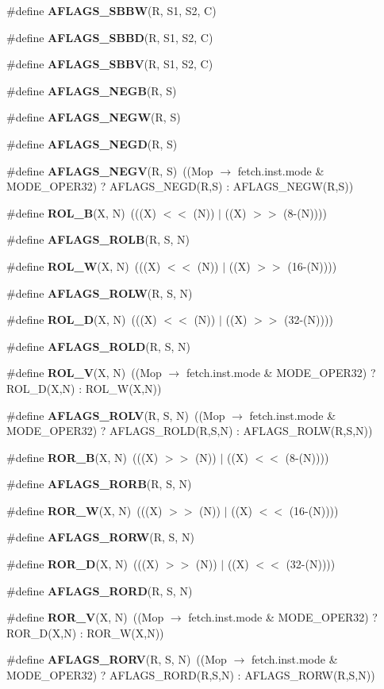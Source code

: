 \begin{CompactItemize}
\#define {\bf AFLAGS\_\-SBBW}(R, S1, S2, C)
\item 
\#define {\bf AFLAGS\_\-SBBD}(R, S1, S2, C)
\item 
\#define {\bf AFLAGS\_\-SBBV}(R, S1, S2, C)
\item 
\#define {\bf AFLAGS\_\-NEGB}(R, S)
\item 
\#define {\bf AFLAGS\_\-NEGW}(R, S)
\item 
\#define {\bf AFLAGS\_\-NEGD}(R, S)
\item 
\#define {\bf AFLAGS\_\-NEGV}(R, S)~((Mop $\rightarrow$ fetch.inst.mode \& MODE\_\-OPER32) ? AFLAGS\_\-NEGD(R,S) : AFLAGS\_\-NEGW(R,S))
\item 
\#define {\bf ROL\_\-B}(X, N)~(((X) $<$$<$ (N)) $|$ ((X) $>$$>$ (8-(N))))
\item 
\#define {\bf AFLAGS\_\-ROLB}(R, S, N)
\item 
\#define {\bf ROL\_\-W}(X, N)~(((X) $<$$<$ (N)) $|$ ((X) $>$$>$ (16-(N))))
\item 
\#define {\bf AFLAGS\_\-ROLW}(R, S, N)
\item 
\#define {\bf ROL\_\-D}(X, N)~(((X) $<$$<$ (N)) $|$ ((X) $>$$>$ (32-(N))))
\item 
\#define {\bf AFLAGS\_\-ROLD}(R, S, N)
\item 
\#define {\bf ROL\_\-V}(X, N)~((Mop $\rightarrow$ fetch.inst.mode \& MODE\_\-OPER32) ? ROL\_\-D(X,N) : ROL\_\-W(X,N))
\item 
\#define {\bf AFLAGS\_\-ROLV}(R, S, N)~((Mop $\rightarrow$ fetch.inst.mode \& MODE\_\-OPER32) ? AFLAGS\_\-ROLD(R,S,N) : AFLAGS\_\-ROLW(R,S,N))
\item 
\#define {\bf ROR\_\-B}(X, N)~(((X) $>$$>$ (N)) $|$ ((X) $<$$<$ (8-(N))))
\item 
\#define {\bf AFLAGS\_\-RORB}(R, S, N)
\item 
\#define {\bf ROR\_\-W}(X, N)~(((X) $>$$>$ (N)) $|$ ((X) $<$$<$ (16-(N))))
\item 
\#define {\bf AFLAGS\_\-RORW}(R, S, N)
\item 
\#define {\bf ROR\_\-D}(X, N)~(((X) $>$$>$ (N)) $|$ ((X) $<$$<$ (32-(N))))
\item 
\#define {\bf AFLAGS\_\-RORD}(R, S, N)
\item 
\#define {\bf ROR\_\-V}(X, N)~((Mop $\rightarrow$ fetch.inst.mode \& MODE\_\-OPER32) ? ROR\_\-D(X,N) : ROR\_\-W(X,N))
\item 
\#define {\bf AFLAGS\_\-RORV}(R, S, N)~((Mop $\rightarrow$ fetch.inst.mode \& MODE\_\-OPER32) ? AFLAGS\_\-RORD(R,S,N) : AFLAGS\_\-RORW(R,S,N))

\end{CompactItemize}
